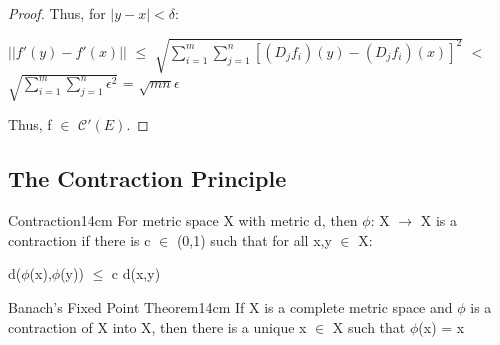 \begin{proof}
        Thus, for $|y-x| < \delta$:

        \hspace{0.3cm}
        $||f'(y) - f'(x)||$
        $\leq$ $\sqrt{\sum_{i=1}^m \sum_{j=1}^n [(D_jf_i)(y) - (D_jf_i)(x)]^2}$
        $<$ $\sqrt{\sum_{i=1}^m \sum_{j=1}^n \epsilon^2}$
        = $\sqrt{mn}\epsilon$

        Thus, f $\in$ $\mathscr{C}'(E)$.
    \end{proof}

    \newpage





\subsection{ The Contraction Principle }

    \begin{definition}{Contraction}{14cm}
        For metric space X with metric d, then $\phi$: X $\rightarrow$ X
        is a {\color{lblue} contraction} if there is c $\in$ (0,1) such that
        for all x,y $\in$ X:

        \hspace{0.5cm}
        d($\phi$(x),$\phi$(y)) $\leq$ c d(x,y)
    \end{definition}

    \vspace{0.5cm}



    \begin{wtheorem}{Banach's Fixed Point Theorem}{14cm}
        If X is a complete metric space and $\phi$ is a contraction
        of X into X, then there is a unique x $\in$ X
        such that $\phi$(x) = x
    \end{wtheorem}

